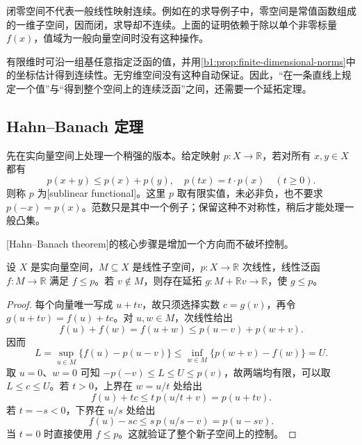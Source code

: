 闭零空间不代表一般线性映射连续。例如在的求导例子中，零空间是常值函数组成的一维子空间，因而闭，求导却不连续。上面的证明依赖于除以单个非零标量 \(f(x)\)，值域为一般向量空间时没有这种操作。

\ProseParagraphBreak

有限维时可沿一组基任意指定泛函的值，并用\cref{b1:prop:finite-dimensional-norms}中的坐标估计得到连续性。无穷维空间没有这种自动保证。因此，“在一条直线上规定一个值”与“得到整个空间上的连续泛函”之间，还需要一个延拓定理。

\subsection{Hahn--Banach 定理}
\label{b1:subsec:080202}

先在实向量空间上处理一个稍强的版本。给定映射 \(p:X\rightarrow\mathbb R\)，若对所有 \(x,y\in X\) 都有
\[
p(x+y)\leq p(x)+p(y),
\quad p(tx)=t\cdot p(x)\quad(t\geq0).
\]
则称 \(p\) 为[sublinear functional]。这里 \(p\) 取有限实值，未必非负，也不要求 \(p(-x)=p(x)\)。范数只是其中一个例子；保留这种不对称性，稍后才能处理一般凸集。

\ProseParagraphBreak

[Hahn--Banach theorem]的核心步骤是增加一个方向而不破坏控制。

\begin{lemma}\label{b1:lem:hahn-banach-one-step}
设 \(X\) 是实向量空间，\(M\subseteq X\) 是线性子空间，\(p:X\to\mathbb R\) 次线性，线性泛函 \(f:M\rightarrow\mathbb R\) 满足 \(f\leq p\)。若 \(v\notin M\)，则存在延拓 \(g:M+\mathbb Rv\rightarrow\mathbb R\)，使 \(g\leq p\)。
\end{lemma}
\begin{proof}
每个向量唯一写成 \(u+tv\)，故只须选择实数 \(c=g(v)\)，再令 \(g(u+tv)=f(u)+tc\)。对 \(u,w\in M\)，次线性给出
\[
f(u)+f(w)=f(u+w)
\leq p(u-v)+p(w+v).
\]
因而
\[
L=\sup_{u\in M}\{f(u)-p(u-v)\}
\leq\inf_{w\in M}\{p(w+v)-f(w)\}=U.
\]
取 \(u=0\)、\(w=0\) 可知 \(-p(-v)\leq L\leq U\leq p(v)\)，故两端均有限，可以取 \(L\leq c\leq U\)。若 \(t>0\)，上界在 \(w=u/t\) 处给出
\[
f(u)+tc\leq t\,p(u/t+v)=p(u+tv).
\]
若 \(t=-s<0\)，下界在 \(u/s\) 处给出
\[
f(u)-sc\leq s\,p(u/s-v)=p(u-sv).
\]
当 \(t=0\) 时直接使用 \(f\leq p\)。这就验证了整个新子空间上的控制。
\end{proof}

